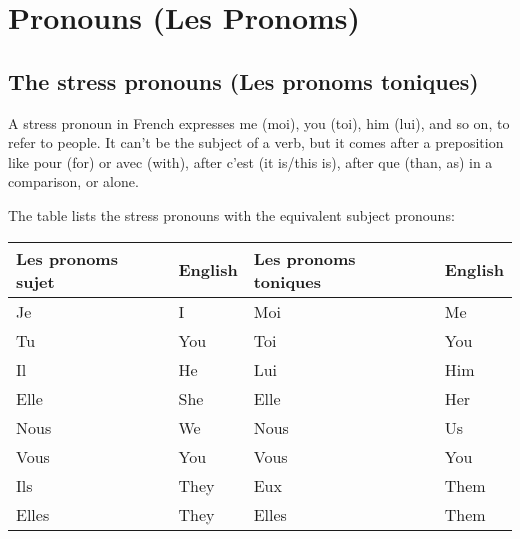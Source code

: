 \section{Pronouns (Les Pronoms)}


\subsection{The stress pronouns (Les pronoms toniques)}

A stress pronoun in French expresses me (moi), you (toi), him (lui),
and so on, to refer to people. It can’t be the subject of a verb,
but it comes after a preposition like pour (for) or avec (with),
after c’est (it is/this is), after que (than, as) in a comparison, or alone.

\noindent The table lists the stress pronouns with the equivalent subject
pronouns:

\vspace{.2in}
\begin{tabular}{l l | l l}
\hline
Les pronoms sujet & English & Les pronoms toniques & English\\
\hline
Je      & I         & Moi       & Me      \\
Tu      & You       & Toi       & You     \\
Il      & He        & Lui       & Him     \\
Elle    & She       & Elle      & Her     \\
Nous    & We        & Nous      & Us      \\
Vous    & You       & Vous      & You     \\
Ils     & They      & Eux       & Them    \\
Elles   & They      & Elles     & Them    \\
\hline
\end{tabular}

